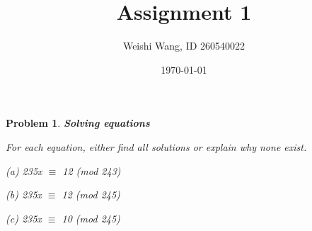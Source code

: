 \documentclass{article}
\newtheorem{problem}{Problem}
\theoremstyle{definition}
\begin{document}
 \title{Assignment 1} 

\author{Weishi Wang, ID 260540022} 

\date{\today}

\maketitle

\begin{problem} 
\textbf{Solving equations}

For each equation, either find all solutions or explain why none exist.

(a) 235x \(\equiv\) 12 (mod 243)

(b) 235x \(\equiv\) 12 (mod 245)

(c) 235x \(\equiv\) 10 (mod 245)

\end{problem}
\end{document}
